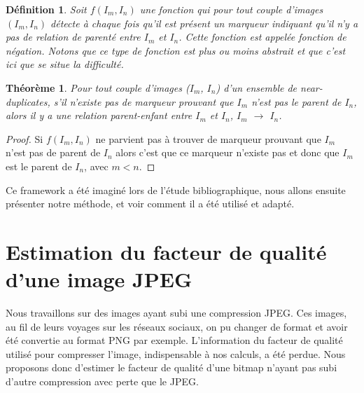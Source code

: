 \documentclass[utf8,final]{stageM2R} %
\begin{document}
\newtheorem*{fonction}{Définition}
\begin{fonction}
  Soit $f(I_{m},I_{n})$ une fonction qui pour tout couple d'images $(I_{m}, I_{n})$ détecte à chaque fois qu'il est présent un marqueur indiquant qu'il n'y a pas de relation de parenté entre $I_{m}$ et $I_{n}$. Cette fonction est appelée fonction de négation. Notons que ce type de fonction est plus ou moins abstrait et que c'est ici que se situe la difficulté.
\end{fonction}

\newtheorem*{parentage}{Théorème}
\begin{parentage}
  Pour tout couple d'images ($I_{m}$, $I_{n}$) d'un ensemble de near-duplicates, s'il n'existe pas de marqueur prouvant que $I_{m}$ n'est pas le parent de $I_{n}$, alors il y a une relation parent-enfant entre $I_{m}$ et $I_{n}$, $I_{m}$ $\to$ $I_{n}$.
\end{parentage}

\begin{proof}
  Si $f(I_{m},I_{n})$ ne parvient pas à trouver de marqueur prouvant que $I_{m}$ n'est pas de parent de $I_{n}$ alors c'est que ce marqueur n'existe pas et donc que $I_{m}$ est le parent de $I_{n}$, avec $m < n$.
\end{proof}

Ce framework a été imaginé lors de l'étude bibliographique, nous allons ensuite présenter notre méthode, et voir comment il a été utilisé et adapté.


\section{Estimation du facteur de qualité d'une image JPEG}
Nous travaillons sur des images ayant subi une compression JPEG. Ces images, au fil de leurs voyages sur les réseaux sociaux, on pu changer de format et avoir été convertie au format PNG par exemple. L'information du facteur de qualité utilisé pour compresser l'image, indispensable à nos calculs, a été perdue. Nous proposons donc d'estimer le facteur de qualité d'une bitmap n'ayant pas subi d'autre compression avec perte que le JPEG.

\end{document}
